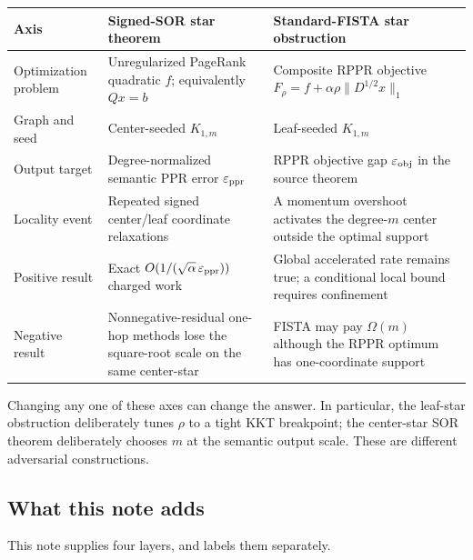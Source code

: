 \begin{center}
\begin{tabular}{p{}p{}p{}}
\toprule
Axis & Signed-SOR star theorem & Standard-FISTA star obstruction \\
\midrule
Optimization problem & Unregularized PageRank quadratic $f$; equivalently
$Qx=b$ & Composite RPPR objective $F_\rho=f+\alpha\rho
\|D^{1/2}x\|_1$ \\
Graph and seed & Center-seeded $K_{1,m}$ & Leaf-seeded $K_{1,m}$ \\
Output target & Degree-normalized semantic PPR error
$\varepsilon_{\rm ppr}$ & RPPR objective gap
$\varepsilon_{\rm obj}$ in the source theorem \\
Locality event & Repeated signed center/leaf coordinate relaxations & A
momentum overshoot activates the degree-$m$ center outside the optimal support
\\
Positive result & Exact
$O(1/(\sqrt\alpha\,\varepsilon_{\rm ppr}))$ charged work & Global
accelerated rate remains true; a conditional local bound requires confinement
\\
Negative result & Nonnegative-residual one-hop methods lose the square-root
scale on the same center-star & FISTA may pay $\Omega(m)$ although the RPPR
optimum has one-coordinate support \\
\bottomrule
\end{tabular}
\end{center}

Changing any one of these axes can change the answer.  In particular, the
leaf-star obstruction deliberately tunes $\rho$ to a tight KKT breakpoint;
the center-star SOR theorem deliberately chooses $m$ at the semantic output
scale.  These are different adversarial constructions.

\subsection{What this note adds}

This note supplies four layers, and labels them separately.

